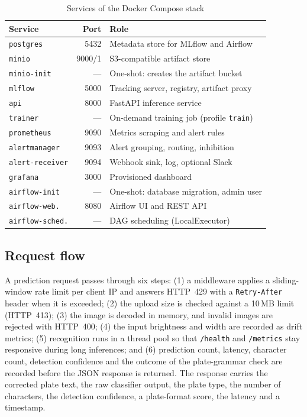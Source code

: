 \documentclass[conference]{IEEEtran}
\newcommand{\code}[1]{\texttt{#1}}
\begin{document}
\begin{table}[t]
\centering
\caption{Services of the Docker Compose stack}
\label{tab:services}
\setlength{\tabcolsep}{3pt}
\footnotesize
\begin{tabular}{@{}lrL{4.4cm}@{}}
\toprule
Service & Port & Role \\
\midrule
\code{postgres} & 5432 & Metadata store for MLflow and Airflow \\
\code{minio} & 9000/1 & S3-compatible artifact store \\
\code{minio-init} & --- & One-shot: creates the artifact bucket \\
\code{mlflow} & 5000 & Tracking server, registry, artifact proxy \\
\code{api} & 8000 & FastAPI inference service \\
\code{trainer} & --- & On-demand training job (profile \code{train}) \\
\code{prometheus} & 9090 & Metrics scraping and alert rules \\
\code{alertmanager} & 9093 & Alert grouping, routing, inhibition \\
\code{alert-receiver} & 9094 & Webhook sink, log, optional Slack \\
\code{grafana} & 3000 & Provisioned dashboard \\
\code{airflow-init} & --- & One-shot: database migration, admin user \\
\code{airflow-web.} & 8080 & Airflow UI and REST API \\
\code{airflow-sched.} & --- & DAG scheduling (LocalExecutor) \\
\bottomrule
\end{tabular}
\end{table}

\subsection{Request flow}
A prediction request passes through six steps: (1) a middleware applies a
sliding-window rate limit per client IP and answers HTTP~429 with a
\code{Retry-After} header when it is exceeded; (2) the upload size is checked
against a 10\,MB limit (HTTP~413); (3) the image is decoded in memory, and
invalid images are rejected with HTTP~400; (4) the input brightness and width are
recorded as drift metrics; (5) recognition runs in a thread pool so that
\code{/health} and \code{/metrics} stay responsive during long inferences; and
(6) prediction count, latency, character count, detection confidence and the
outcome of the plate-grammar check are recorded before the JSON response is
returned. The response carries the corrected plate text, the raw classifier
output, the plate type, the number of characters, the detection confidence, a
plate-format score, the latency and a timestamp.
\end{document}
